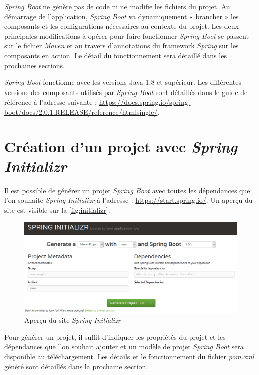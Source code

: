 \documentclass{polytech/polytech}
\begin{document}
\textit{Spring Boot} ne génère pas de code ni ne modifie les fichiers du projet. Au démarrage de l'application, \textit{Spring Boot} va dynamiquement « brancher » les composants et les configurations nécessaires au contexte du projet. Les deux principales modifications à opérer pour faire fonctionner \textit{Spring Boot} se passent sur le fichier \textit{Maven} et au travers d’annotations du framework \textit{Spring} sur les composants en action. Le détail du fonctionnement sera détaillé dans les prochaines sections. 

\textit{Spring Boot} fonctionne avec les versions Java 1.8 et supérieur. Les différentes versions des composants utilisés par \textit{Spring Boot} sont détaillés dans le guide de référence à l’adresse suivante : \url{https://docs.spring.io/spring-boot/docs/2.0.1.RELEASE/reference/htmlsingle/}.


\section{Création d'un projet avec \textit{Spring Initializr}}

Il est possible de générer un projet \textit{Spring Boot} avec toutes les dépendances que l’on souhaite \textit{Spring Initializr} à l’adresse : \url{https://start.spring.io/}. Un aperçu du site est visible sur la \autoref{fig:initializr}.

\begin{figure}
	\includegraphics[scale=0.5]{images/springInitializr}
	\caption{Aperçu du site \textit{Spring Initializr}}
	\label{fig:initializr}
\end{figure}

Pour générer un projet, il suffit d’indiquer les propriétés du projet et les dépendances que l’on souhait ajouter et un modèle de projet \textit{Spring Boot} sera disponible au téléchargement. Les détails et le fonctionnement du fichier \textit{pom.xml} généré sont détaillés dans la prochaine section. 
\end{document}

